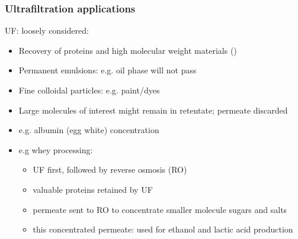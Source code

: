 \begin{frame}\frametitle{Ultrafiltration applications} 
	UF: loosely considered: {\color{myGreen}{``cross-flow filtration at molecular level''}}
	\begin{itemize}
		\item	Recovery of proteins and high molecular weight materials ({\color{purple}{solute}})
		\item	Permanent emulsions: e.g. oil phase will not pass
		\item	Fine colloidal particles: e.g. paint/dyes 
		\item	Large molecules of interest might remain in retentate; permeate discarded
		\item	e.g. albumin (egg white) concentration
		\item	e.g whey processing: %
		\begin{itemize}
			\item	UF first, followed by reverse osmosis (RO)
			\item	valuable proteins retained by UF
			\item	permeate sent to RO to concentrate smaller molecule sugars and salts
			\item	this concentrated permeate: used for ethanol and lactic acid production
		\end{itemize}
	\end{itemize}
\end{frame}

